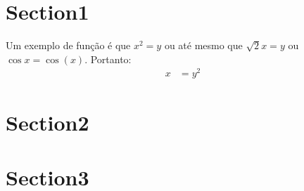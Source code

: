 \documentclass[12pt]{article}
\begin{document}
\tableofcontents
\clearpage
\section{Section1}

Um exemplo de função é que $x^2 = y$ ou até mesmo que $\sqrt{2}x=y$ ou $\cos x=\cos(x)$. Portanto:
\begin{align}
x &= y^2
\end{align}
\section*{Section2}

\section{Section3}
\end{document}

